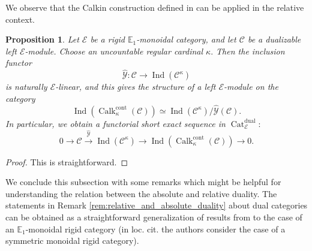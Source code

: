 \documentclass[11pt,leqno]{amsart}
\newtheorem{prop}[theo]{Proposition}
\numberwithin{equation}{section}
\newcommand{\xto}{\xrightarrow}
\newcommand{\Cat}{\operatorname{Cat}}
\newcommand{\cont}{\operatorname{cont}}
\newcommand{\dual}{\operatorname{dual}}
\newcommand{\bE}{{\mathbb E}}
\newcommand{\cC}{{\mathcal C}}
\newcommand{\cE}{{\mathcal E}}
\newcommand{\cY}{{\mathcal Y}}
\newcommand{\Ind}{\operatorname{Ind}}
\newcommand{\Calk}{\operatorname{Calk}}
\begin{document}
We observe that the Calkin construction defined in \cite[Section 1.11]{E24} can be applied in the relative context.

\begin{prop}\label{prop:Calkin_over_rigid} Let $\cE$ be a rigid $\bE_1$-monoidal category, and let $\cC$ be a dualizable left $\cE$-module. Choose an uncountable regular cardinal $\kappa.$ Then the inclusion functor
\begin{equation*}
\hat{\cY}:\cC\to\Ind(\cC^{\kappa})
\end{equation*}
is naturally $\cE$-linear, and this gives the structure of a left $\cE$-module on the category
\begin{equation*}
\Ind(\Calk_{\kappa}^{\cont}(\cC))\simeq \Ind(\cC^{\kappa})/\hat{\cY}(\cC).
\end{equation*}
In particular, we obtain a functorial short exact sequence in $\Cat_{\cE}^{\dual}:$
\begin{equation*}
0\to\cC\xto{\hat{\cY}}\Ind(\cC^{\kappa})\to \Ind(\Calk_{\kappa}^{\cont}(\cC))\to 0.
\end{equation*}
\end{prop}

\begin{proof}
This is straightforward.
\end{proof}

We conclude this subsection with some remarks which might be helpful for understanding the relation between the absolute and relative duality. The statements in Remark \ref{rem:relative_and_absolute_duality} about dual categories can be obtained as a straightforward generalization of results from \cite[Section 9.4]{GaRo17} to the case of an $\bE_1$-monoidal rigid category (in loc. cit. the authors consider the case of a symmetric monoidal rigid category). 
\end{document}
